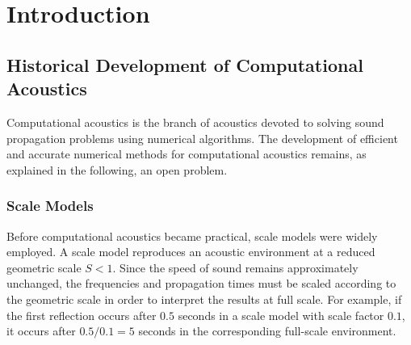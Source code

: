 \documentclass{Configuration_Files/PoliMi3i_thesis}
\begin{document}
%
%
%    
%

\mainmatter %

\chapter{Introduction}
\setcounter{secnumdepth}{1}
\section{Historical Development of Computational Acoustics}
Computational acoustics is the branch of acoustics devoted to solving sound propagation problems using numerical algorithms. The development of efficient and accurate numerical methods for computational acoustics remains, as explained in the following, an open problem.

\subsection{Scale Models}
Before computational acoustics became practical, scale models were widely employed. A scale model reproduces an acoustic environment at a reduced geometric scale $S<1$. Since the speed of sound remains approximately unchanged, the frequencies and propagation times must be scaled according to the geometric scale in order to interpret the results at full scale. For example, if the first reflection occurs after $0.5$ seconds in a scale model with scale factor $0.1$, it occurs after $0.5/0.1=5$ seconds in the corresponding full-scale environment.
\end{document}
